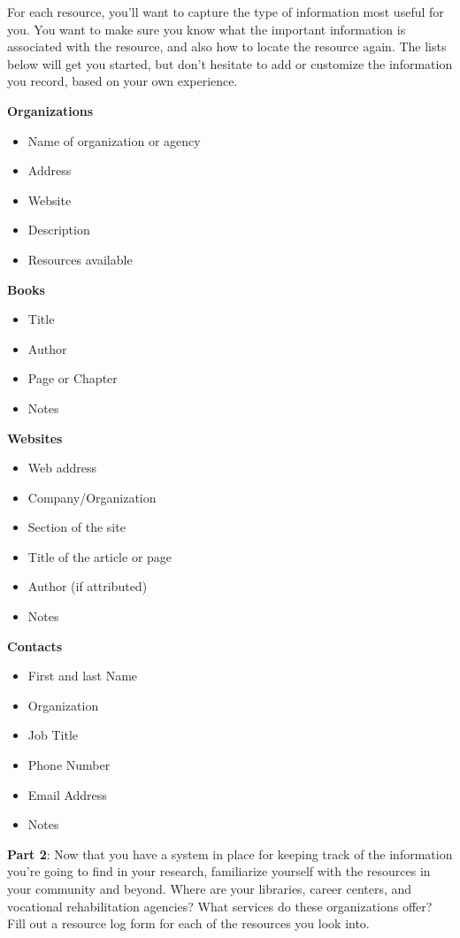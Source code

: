 For each resource, you'll want to capture the type of information most useful for you. You want to make sure you know what the important information is associated with the resource, and also how to locate the resource again. The lists below will get you started, but don't hesitate to add or customize the information you record, based on your own experience.

\pagebreak \textbf{Organizations}
\begin{itemize}[leftmargin=*]
\item Name of organization or agency
\item Address
\item Website
\item Description
\item Resources available 
\end{itemize}
\textbf{Books}
\begin{itemize}[leftmargin=*]
\item Title
\item Author
\item Page or Chapter
\item Notes
\end{itemize}
\textbf{Websites}
\begin{itemize}[leftmargin=*]
\item Web address
\item Company/Organization
\item Section of the site
\item Title of the article or page
\item Author (if attributed)
\item Notes 
\end{itemize}
\textbf{Contacts}
\begin{itemize}[leftmargin=*]
\item First and last Name
\item Organization
\item Job Title
\item Phone Number
\item Email Address
\item Notes
\end{itemize}
\pagebreak \textbf{Part 2}: Now that you have a system in place for keeping track of the information you're going to find in your research, familiarize yourself with the resources in your community and beyond. Where are your libraries, career centers, and vocational rehabilitation agencies? What services do these organizations offer? Fill out a resource log form for each of the resources you look into.

